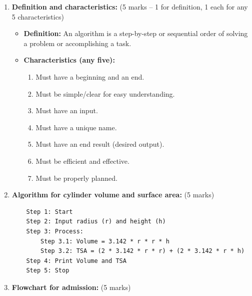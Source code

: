 \documentclass[12pt]{article}
\begin{document}
\begin{enumerate}[label=(\alph*)]
    \item \textbf{Definition and characteristics:} \hfill (5 marks -- 1 for definition, 1 each for any 5 characteristics)
    \begin{itemize}
        \item \textbf{Definition:} An algorithm is a step-by-step or sequential order of solving a problem or accomplishing a task.
        \item \textbf{Characteristics (any five):}
        \begin{enumerate}
            \item Must have a beginning and an end.
            \item Must be simple/clear for easy understanding.
            \item Must have an input.
            \item Must have a unique name.
            \item Must have an end result (desired output).
            \item Must be efficient and effective.
            \item Must be properly planned.
        \end{enumerate}
    \end{itemize}

    \item \textbf{Algorithm for cylinder volume and surface area:} \hfill (5 marks)
    \begin{verbatim}
    Step 1: Start
    Step 2: Input radius (r) and height (h)
    Step 3: Process:
        Step 3.1: Volume = 3.142 * r * r * h
        Step 3.2: TSA = (2 * 3.142 * r * r) + (2 * 3.142 * r * h)
    Step 4: Print Volume and TSA
    Step 5: Stop
    \end{verbatim}

    \item \textbf{Flowchart for admission:} \hfill (5 marks)
    \begin{center}
    \end{center}
\end{enumerate}
\end{document}
